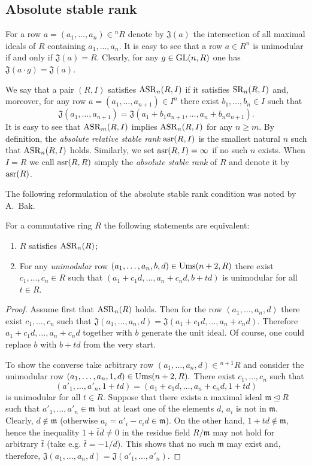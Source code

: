 \subsection{Absolute stable rank}
For a row $a=(a_1,\ldots,a_n)\in{}^n\!R$ denote by $\mathfrak{J}(a)$ the intersection of all maximal ideals of $R$ containing $a_1,\ldots,a_n$.
It is easy to see that a row $a\in R^n$ is unimodular if and only if $\mathfrak{J}(a)=R$. 
Clearly, for any $g\in\operatorname{GL}(n,R)$ one has $\mathfrak{J}(a\cdot g)=\mathfrak{J}(a)$.
\begin{dfn}
We say that a pair $(R,I)$ satisfies $\operatorname{ASR}_n(R,I)$ if it satisfies $\operatorname{SR}_n(R,I)$ and, moreover, 
for any row $a=(a_1,\ldots,a_{n+1})\in I^n$ there exist $b_1,\ldots,b_n\in I$ such that
\[\mathfrak{J}(a_1,\ldots,a_{n+1})=\mathfrak{J}(a_1+b_1a_{n+1},\ldots,a_n+b_na_{n+1}).\]
It is easy to see that $\operatorname{ASR}_m(R,I)$ implies $\operatorname{ASR}_n(R,I)$ for any $n\geqslant m$. 
By definition, the \emph{absolute relative stable rank} $\operatorname{asr}(R,I)$ is the smallest natural $n$ such that $\operatorname{ASR}_n(R, I)$ holds. 
Similarly, we set $\operatorname{asr}(R,I)=\infty$ if no such $n$ exists.
When $I=R$ we call $\operatorname{asr}(R, R)$ simply the \emph{absolute stable rank} of $R$ and denote it by $\operatorname{asr}(R)$.
\end{dfn}
The following reformulation of the absolute stable rank condition was noted by A.~Bak.
\begin{lemma} For a commutative ring $R$ the following statements are equivalent:
\begin{enumerate}
 \item\label{asr_Stein} $R$ satisfies $\operatorname{ASR}_n(R)$;
 \item\label{asr_Bak} For any \emph{unimodular} row $(a_1,\ldots,a_n,b,d)\in\operatorname{Ums}(n+2,R)$ there exist $c_1,\ldots,c_n\in R$ such that $(a_1+c_1d,\ldots,a_n+c_nd,b+td)$ is unimodular for all $t\in R$.
\end{enumerate}
\end{lemma}
\begin{proof}
Assume first that $\operatorname{ASR}_n(R)$ holds.
Then for the row $(a_1,\ldots,a_n,d)$ there exist $c_1,\ldots,c_n$ such that $\mathfrak{J}(a_1,\ldots,a_n,d)=\mathfrak{J}(a_1+c_1d,\ldots,a_n+c_nd)$. 
Therefore $a_1+c_1d,\ldots,a_n+c_nd$ together with $b$ generate the unit ideal.
Of course, one could replace $b$ with $b+td$ from the very start.

To show the converse take arbitrary row $(a_1,\ldots,a_n,d)\in{}^{n+1}\!R$ and consider the unimodular row $(a_1,\ldots,a_n,1,d)\in\operatorname{Ums}(n+2,R).$
There exist $c_1,\ldots,c_n$ such that \[(a'_1,\ldots,a'_n,1+td)=(a_1+c_1d,\ldots,a_n+c_nd,1+td)\] is unimodular for all $t\in R$.
Suppose that there exists a maximal ideal $\mathfrak{m}\trianglelefteq R$ such that $a'_1,\ldots,a'_n\in\mathfrak{m}$ but at least one of the elements $d$, $a_i$ is not in $\mathfrak{m}$.
Clearly, $d\notin\mathfrak{m}$ (otherwise $a_i=a'_i-c_id\in\mathfrak{m}$).
On the other hand, $1+td\notin\mathfrak{m}$, hence the inequality $1+\bar{t}\bar{d}\neq0$ in the residue field $R/\mathfrak{m}$ may not hold for arbitrary $\bar{t}$ (take e.g. $\bar{t}=-1/\bar{d}$).
This shows that no such $\mathfrak{m}$ may exist and, therefore, $\mathfrak{J}(a_1,\ldots,a_n,d)=\mathfrak{J}(a'_1,\ldots,a'_n)$.
\end{proof}


